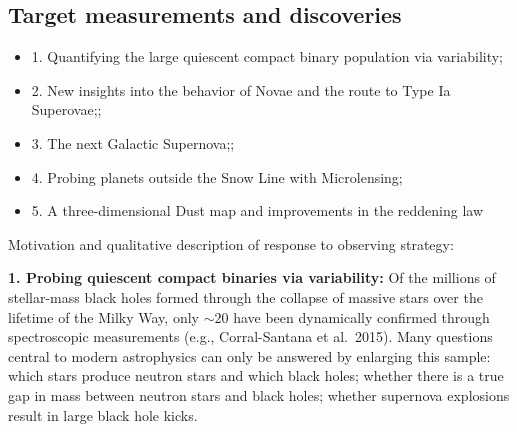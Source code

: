 
\subsection{Target measurements and discoveries}
\label{sec:keyword:MW_Disk_targets}



\begin{itemize}
  \item 1. Quantifying the large quiescent compact binary population via variability;
  \item 2. New insights into the behavior of Novae and the route to Type Ia Superovae;;
  \item 3. The next Galactic Supernova;;
  \item 4. Probing planets outside the Snow Line with Microlensing;
  \item 5. A three-dimensional Dust map and improvements in the reddening law
\end{itemize}

Motivation and qualitative description of response to observing strategy:

{\bf 1. Probing quiescent compact binaries via variability:} Of the
millions of stellar-mass black holes formed through the collapse of
massive stars over the lifetime of the Milky Way, only $\sim 20$ have
been dynamically confirmed through spectroscopic measurements (e.g.,
Corral-Santana et al.~2015). Many questions central to modern
astrophysics can only be answered by enlarging this sample: which
stars produce neutron stars and which black holes; whether there is a
true gap in mass between neutron stars and black holes; whether
supernova explosions result in large black hole kicks. 

